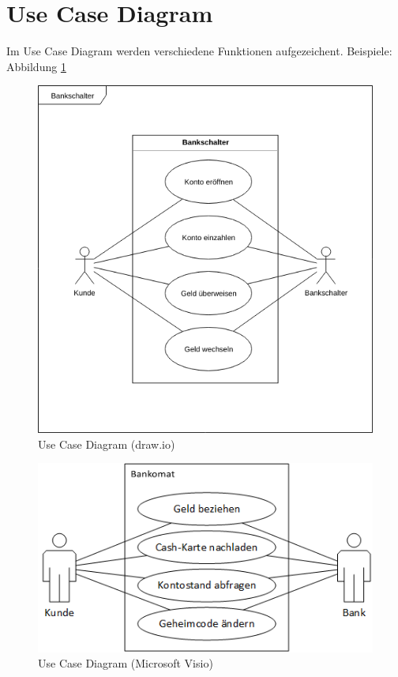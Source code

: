\documentclass[a4paper, titlepage]{scrartcl}
\begin{document}
    \section{Use Case Diagram}
    Im Use Case Diagram werden verschiedene Funktionen aufgezeichent. 
    Beispiele: Abbildung \ref{UseCaseDrawIO}
    \begin{figure}
        \includegraphics[width=\textwidth]{Anwendungsfalldiagramm1a.png}
        \caption{Use Case Diagram (draw.io)}
        \label{UseCaseDrawIO}
    \end{figure}
    \begin{figure}
        \includegraphics[width=\textwidth]{Anwendungsfalldiagramm1c.png}
        \caption{Use Case Diagram (Microsoft Visio)}
        \label{UseCaseVisio}
    \end{figure}
\end{document}
